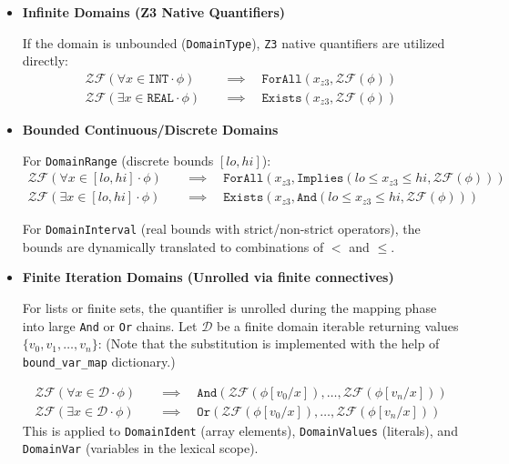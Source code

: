 \documentclass{article}
\begin{document}
\begin{itemize}
    \item \textbf{Infinite Domains (Z3 Native Quantifiers)}
    
    If the domain is unbounded (\texttt{DomainType}), \texttt{Z3} native quantifiers are utilized directly:
    \[
    \begin{aligned}
    \mathcal{ZF}(\forall x \in \texttt{INT} \cdot \phi) \quad &\implies \quad \texttt{ForAll}(x_{z3}, \mathcal{ZF}(\phi)) \\
    \mathcal{ZF}(\exists x \in \texttt{REAL} \cdot \phi) \quad &\implies \quad \texttt{Exists}(x_{z3}, \mathcal{ZF}(\phi))
    \end{aligned}
    \]
    
    \item \textbf{Bounded Continuous/Discrete Domains}
    
    For \texttt{DomainRange} (discrete bounds $[lo, hi]$):
    \[
    \begin{aligned}
    \mathcal{ZF}(\forall x \in [lo, hi] \cdot \phi) \quad &\implies \quad \texttt{ForAll}(x_{z3}, \texttt{Implies}(lo \le x_{z3} \le hi, \mathcal{ZF}(\phi))) \\
    \mathcal{ZF}(\exists x \in [lo, hi] \cdot \phi) \quad &\implies \quad \texttt{Exists}(x_{z3}, \texttt{And}(lo \le x_{z3} \le hi, \mathcal{ZF}(\phi)))
    \end{aligned}
    \]

    For \texttt{DomainInterval} (real bounds with strict/non-strict operators), the bounds are dynamically translated to combinations of $<$ and $\le$.
    
    \item \textbf{Finite Iteration Domains (Unrolled via finite connectives)}
    
    For lists or finite sets, the quantifier is unrolled during the mapping phase into large \texttt{And} or \texttt{Or} chains. Let $\mathcal{D}$ be a finite domain iterable returning values $\{v_0, v_1, \dots, v_n\}$: (Note that the substitution is implemented with the help of \texttt{bound\_var\_map} dictionary.)
    
    \[
    \begin{aligned}
    \mathcal{ZF}(\forall x \in \mathcal{D} \cdot \phi) \quad &\implies \quad \texttt{And}( \mathcal{ZF}(\phi[v_0/x]), \dots, \mathcal{ZF}(\phi[v_n/x]) ) \\
    \mathcal{ZF}(\exists x \in \mathcal{D} \cdot \phi) \quad &\implies \quad \texttt{Or}( \mathcal{ZF}(\phi[v_0/x]), \dots, \mathcal{ZF}(\phi[v_n/x]) )
    \end{aligned}
    \]
    This is applied to \texttt{DomainIdent} (array elements), \texttt{DomainValues} (literals), and \texttt{DomainVar} (variables in the lexical scope).
    
\end{itemize}
\end{document}
